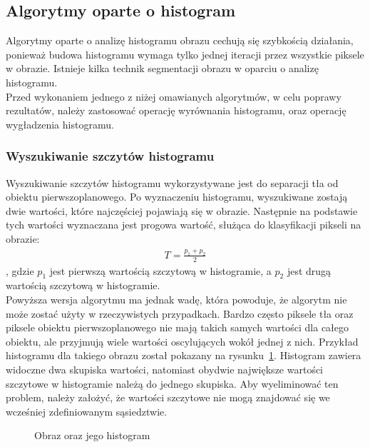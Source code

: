 \subsection{Algorytmy oparte o histogram}
Algorytmy oparte o analizę histogramu obrazu cechują się szybkością działania, ponieważ budowa histogramu wymaga tylko jednej iteracji przez wszystkie piksele w obrazie. Istnieje kilka technik segmentacji obrazu w oparciu o analizę histogramu. \\
Przed wykonaniem jednego z niżej omawianych algorytmów, w celu poprawy rezultatów, należy zastosować operację wyrównania histogramu, oraz operację wygładzenia histogramu.

\subsubsection{Wyszukiwanie szczytów histogramu}
Wyszukiwanie szczytów histogramu wykorzystywane jest do separacji tła od obiektu pierwszoplanowego. Po wyznaczeniu histogramu, wyszukiwane zostają dwie wartości, które najczęściej pojawiają się w obrazie. Następnie na podstawie tych wartości wyznaczana jest progowa wartość, służąca do klasyfikacji pikseli na obrazie:
\begin{gather*}
  T = \frac{p_1 + p_2}{2}
\end{gather*}, gdzie $p_1$ jest pierwszą wartością szczytową w histogramie, a $p_2$ jest drugą wartością szczytową w histogramie. \\
Powyższa wersja algorytmu ma jednak wadę, która powoduje, że algorytm nie może zostać użyty w rzeczywistych przypadkach. Bardzo często piksele tła oraz piksele obiektu pierwszoplanowego nie mają takich samych wartości dla całego obiektu, ale przyjmują wiele wartości oscylujących wokół jednej z nich. Przykład histogramu dla takiego obrazu został pokazany na rysunku~\ref{fig:histogram_peaks}. Histogram zawiera widoczne dwa skupiska wartości, natomiast obydwie największe wartości szczytowe w histogramie należą do jednego skupiska. Aby wyeliminować ten problem, należy założyć, że wartości szczytowe nie mogą znajdować się we wcześniej zdefiniowanym sąsiedztwie. 

\begin{figure}
  \centering
  \caption{Obraz oraz jego histogram}
  \label{fig:histogram_peaks}
\end{figure}

